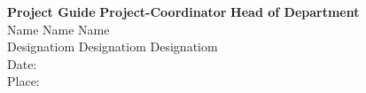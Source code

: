 \textbf{Project Guide} \hfill \textbf{Project-Coordinator} \hfill \textbf{Head of Department} \\

\vspace*{0.5cm}
\hspace*{0.5cm} Name\hspace*{4.5cm} Name \hspace*{4.5cm} Name \\
\hspace*{0.5cm}Designatiom \hspace*{3.5cm} Designatiom \hspace*{3.5cm} Designatiom \\


\vspace*{1.5cm}
\justify
Date:\\
Place: 






